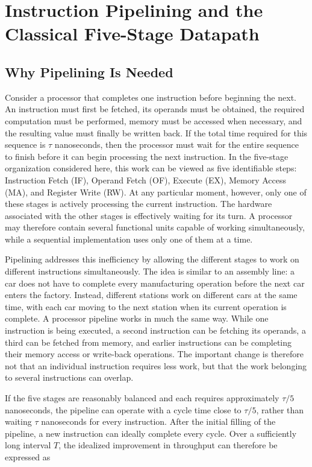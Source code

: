 \documentclass[11pt,a4paper]{report}
\begin{document}
\section{Instruction Pipelining and the Classical Five-Stage Datapath}
\label{sec:datapath}

\subsection{Why Pipelining Is Needed}

Consider a processor that completes one instruction before beginning the next. An instruction must first be fetched, its operands must be obtained, the required computation must be performed, memory must be accessed when necessary, and the resulting value must finally be written back. If the total time required for this sequence is $\tau$ nanoseconds, then the processor must wait for the entire sequence to finish before it can begin processing the next instruction. In the five-stage organization considered here, this work can be viewed as five identifiable steps: Instruction Fetch (IF), Operand Fetch (OF), Execute (EX), Memory Access (MA), and Register Write (RW). At any particular moment, however, only one of these stages is actively processing the current instruction. The hardware associated with the other stages is effectively waiting for its turn. A processor may therefore contain several functional units capable of working simultaneously, while a sequential implementation uses only one of them at a time.

Pipelining addresses this inefficiency by allowing the different stages to work on different instructions simultaneously. The idea is similar to an assembly line: a car does not have to complete every manufacturing operation before the next car enters the factory. Instead, different stations work on different cars at the same time, with each car moving to the next station when its current operation is complete. A processor pipeline works in much the same way. While one instruction is being executed, a second instruction can be fetching its operands, a third can be fetched from memory, and earlier instructions can be completing their memory access or write-back operations. The important change is therefore not that an individual instruction requires less work, but that the work belonging to several instructions can overlap.

If the five stages are reasonably balanced and each requires approximately $\tau/5$ nanoseconds, the pipeline can operate with a cycle time close to $\tau/5$, rather than waiting $\tau$ nanoseconds for every instruction. After the initial filling of the pipeline, a new instruction can ideally complete every cycle. Over a sufficiently long interval $T$, the idealized improvement in throughput can therefore be expressed as
\end{document}
